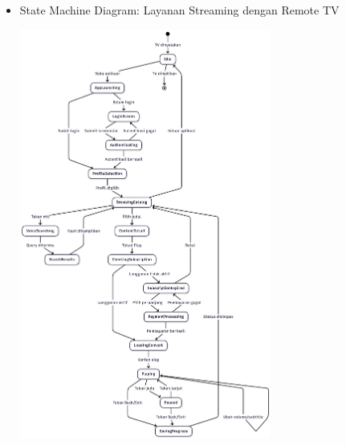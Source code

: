\documentclass[a4paper]{article}
\begin{document}
\begin{enumerate}[itemsep=1em]
  \pagebreak

  \begin{itemize}[itemsep=1em]
    \item State Machine Diagram: Layanan Streaming dengan Remote TV
    \begin{center}
      \includegraphics[width=0.65\textwidth,keepaspectratio]{streaming-state-diagram.png}
    \end{center}
  \end{itemize}

  \pagebreak


\end{enumerate}
\end{document}
